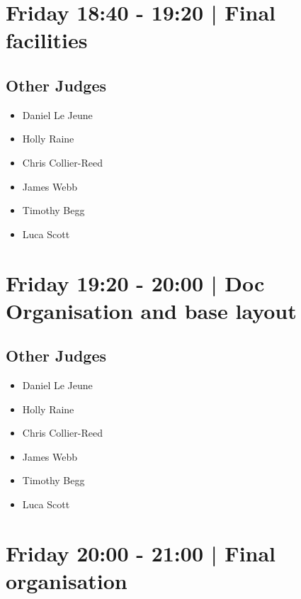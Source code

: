 \documentclass[10pt]{article}
\begin{document}
            \section*{Friday 18:40
        -
        19:20
        |
         Final facilities}
        
                
        \subsection*{Other Judges}
        
            \begin{itemize}
                            \item Daniel Le Jeune
                            \item Holly Raine
                            \item Chris Collier-Reed
                            \item James Webb
                            \item Timothy Begg
                            \item Luca Scott
                        \end{itemize}
        

            \section*{Friday 19:20
        -
        20:00
        |
         Doc Organisation and base layout}
        
                
        \subsection*{Other Judges}
        
            \begin{itemize}
                            \item Daniel Le Jeune
                            \item Holly Raine
                            \item Chris Collier-Reed
                            \item James Webb
                            \item Timothy Begg
                            \item Luca Scott
                        \end{itemize}
        

            \section*{Friday 20:00
        -
        21:00
        |
         Final organisation}
        
\end{document}
